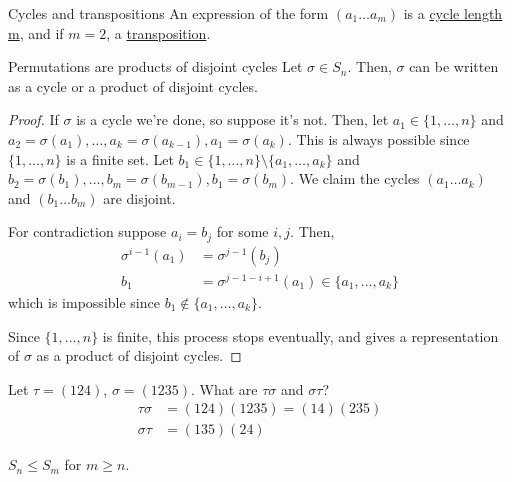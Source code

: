 \documentclass[12pt]{article}
\begin{document}
	\begin{mydef}{Cycles and transpositions}{}
		An expression of the form $(a_1\dots a_m)$ is a \underline{cycle length m}, and if $m=2$, a \underline{transposition}.
	\end{mydef}
	
	\begin{mythm}{Permutations are products of disjoint cycles}{}
		Let $\sigma\in S_n$. Then, $\sigma$ can be written as a cycle or a product of disjoint cycles.
		\begin{proof}
			If $\sigma$ is a cycle we're done, so suppose it's not. Then, let $a_1\in\{1, \dots, n\}$ and $a_2=\sigma(a_1), \dots, a_k=\sigma(a_{k-1}), a_1=\sigma(a_k)$. This is always possible since $\{1, \dots, n\}$ is a finite set. Let $b_1\in\{1, \dots, n\}\setminus\{a_1, \dots, a_k\}$ and $b_2=\sigma(b_1), \dots, b_m=\sigma(b_{m-1}), b_1=\sigma(b_m)$. We claim the cycles $(a_1\dots a_k)$ and $(b_1\dots b_m)$ are disjoint.
			
			For contradiction suppose $a_i=b_j$ for some $i, j$. Then,
			\begin{align*}
				\sigma^{i-1}(a_1)&=\sigma^{j-1}(b_j)\\
				b_1&=\sigma^{j-1-i+1}(a_1)\in\{a_1, \dots, a_k\}
			\end{align*}
			which is impossible since $b_1\notin\{a_1, \dots, a_k\}$.
			
			Since $\{1, \dots, n\}$ is finite, this process stops eventually, and gives a representation of $\sigma$ as a product of disjoint cycles.
		\end{proof}
	\end{mythm}
	
	\begin{myex}{}{}
		Let $\tau=(124)$, $\sigma=(1235)$. What are $\tau\sigma$ and $\sigma\tau$?
		\begin{align*}
			\tau\sigma&=(124)(1235)=(14)(235)\\
			\sigma\tau&=(135)(24)
		\end{align*}
	\end{myex}
	
	\begin{myrem}{}{}
		$S_n\leq S_m$ for $m\geq n$.
	\end{myrem}
	
\end{document}

